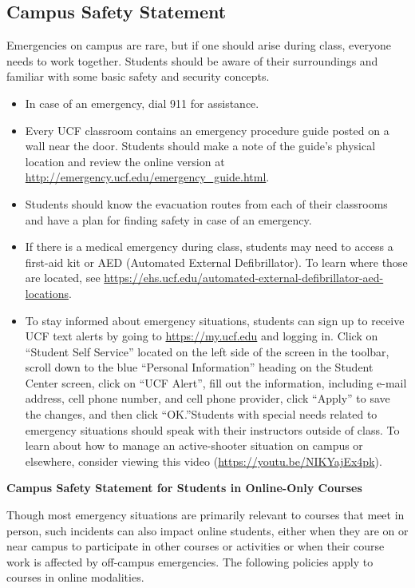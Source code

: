 \documentclass[11pt]{article}
\begin{document}
\subsection*{Campus Safety Statement}

Emergencies on campus are rare, but if one should arise during class, everyone needs to work together. Students should be aware of their surroundings and familiar with some basic safety and security concepts.

\begin{itemize}
    \item In case of an emergency, dial 911 for assistance.
    \item Every UCF classroom contains an emergency procedure guide posted on a
    wall near the door. Students should make a note of the guide’s physical
    location and review the online version at
    \url{http://emergency.ucf.edu/emergency_guide.html}.
    \item Students should know the evacuation routes from each of their classrooms and have a plan for finding safety in case of an emergency.
    \item If there is a medical emergency during class, students may need to
    access a first-aid kit or AED (Automated External Defibrillator). To learn
    where those are located, see
    \url{https://ehs.ucf.edu/automated-external-defibrillator-aed-locations}.
    \item To stay informed about emergency situations, students can sign up to
    receive UCF text alerts by going to \url{https://my.ucf.edu} and logging in.
    Click on “Student Self Service” located on the left side of the screen in the
    toolbar, scroll down to the blue “Personal Information” heading on the Student
    Center screen, click on “UCF Alert”, fill out the information, including e-mail
    address, cell phone number, and cell phone provider, click “Apply” to save the
    changes, and then click “OK.”Students with special needs related to emergency
    situations should speak with their instructors outside of class. To learn about
    how to manage an active-shooter situation on campus or elsewhere, consider
    viewing this video (\url{https://youtu.be/NIKYajEx4pk}).

\end{itemize}

\textbf{Campus Safety Statement for Students in Online-Only Courses}

Though most emergency situations are primarily relevant to courses that meet in
person, such incidents can also impact online students, either when they are on
or near campus to participate in other courses or activities or when their
course work is affected by off-campus emergencies. The following policies apply
to courses in online modalities.
\end{document}
